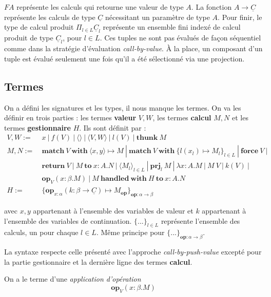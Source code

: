 	$FA$ représente les calculs qui retourne une valeur de type $A$. La fonction $A \rightarrow \underline{C}$ représente les calculs de type $\underline{C}$ nécessitant un paramètre de type $A$. Pour finir, le type de calcul produit $\Pi_{l\in L} \underline{C}_l$ représente un ensemble fini indexé de calcul produit de type $\underline{C}_l$, pour $l \in L$. Ces tuples ne sont pas évalués de façon séquentiel comme dans la stratégie d'évaluation \textit{call-by-value}. À la place, un composant d'un tuple est évalué seulement une fois qu'il a été sélectionné via une projection. 
	
\subsection{Termes}

	On a défini les signatures et les types, il nous manque les termes. On va les définir en trois parties : les termes \textbf{valeur} $V,W$, les termes \textbf{calcul} $M,N$ et les termes \textbf{gestionnaire} $H$. Ils sont définit par :
	\begin{align*}
		V,W :=&~x~|~f(V)~|~\langle\rangle~|~\langle V,W\rangle~|~l(V)~|~\textbf{thunk}~M\\
		M,N :=&~\textbf{match}~V~\textbf{with}~\langle x,y\rangle  \mapsto M~|~\textbf{match}~V~\textbf{with}~\{l(x_l)  \mapsto M_l\}_{l \in L}~|~\textbf{force}~V~|\\
		&~\textbf{return}~V~|~M~\textbf{to}~x:A.N~|~\langle M_l\rangle_{l \in L}~|~\textbf{prj}_l~M~|~\lambda x:A.M~|~M~V~|~k(V)~|\\
		&~\textbf{op}_V(x:\beta .M)~|~M~\textbf{handled}~\textbf{with}~H~\textbf{to}~x:A.N\\
		H :=&~\{\textbf{op}_{x:\alpha}(k:\beta \rightarrow \underline{C}) \mapsto M_\textbf{op} \}_{\textbf{op}:\alpha \rightarrow \beta}
	\end{align*}
	
	avec $x,y$ appartenant à l'ensemble des variables de valeur et $k$ appartenant à l'ensemble des variables de continuation. $\{...\}_{l \in L}$ représente l'ensemble des calculs, un pour chaque $l \in L$. Même principe pour $\{...\}_{\textbf{op} : \alpha \rightarrow \beta}$.

	La syntaxe respecte celle présenté avec l'approche \textit{call-by-push-value} excepté pour la partie gestionnaire et la dernière ligne des termes \textbf{calcul}.
	\smallbreak
	
	On a le terme d'une \textit{application d'opération}
		\[\textbf{op}_V(x:\beta .M)\]
	
